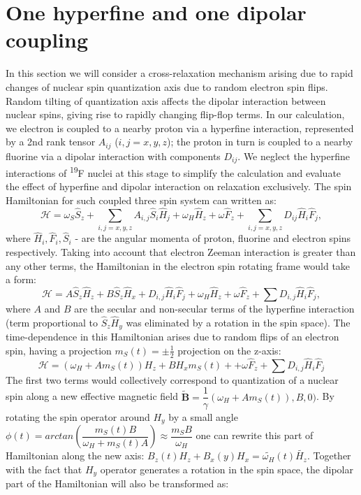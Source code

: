 \documentclass[a4paper, 12pt]{article}
\begin{document}
\section{One hyperfine and one dipolar coupling}
In this section we will consider a cross-relaxation mechanism arising due to rapid changes of nuclear spin quantization axis due to random electron spin flips. Random tilting of quantization axis affects the dipolar interaction between nuclear spins, giving rise to rapidly changing flip-flop terms.
In our calculation, we electron is coupled to a nearby proton via a hyperfine interaction, represented by a 2nd rank tensor $A_{ij}$ ($i,j=x,y,z$); the proton in turn is coupled to a nearby fluorine via a dipolar interaction with components $D_{ij}$. We neglect the hyperfine interactions of \textsuperscript{19}F nuclei at this stage to simplify the calculation and evaluate the effect of hyperfine and dipolar interaction on relaxation exclusively. The spin Hamiltonian for such coupled three spin system can written as: 
\begin{equation}
\mathcal{H} =  \omega_S \hat{S}_z + \sum_{i,j=x,y,z} A_{i,j} \hat{S}_i \hat{H}_j + \omega_H \hat{H}_z + \omega \hat{F}_z + \sum_{i,j=x,y,z} D_{ij} \hat{H}_i \hat{F}_j,
\end{equation}
where $\hat{H}_i, \hat{F}_i, \hat{S}_i$ - are the angular momenta of proton, fluorine and electron spins respectively. Taking into account that electron Zeeman interaction is greater than any other terms, the Hamiltonian in the electron spin rotating frame would take a form:
\begin{equation}
  \mathcal{H}  = A \hat{S}_z \hat{H}_z + B \hat{S}_z \hat{H}_x + D_{i,j} \hat{H}_i \hat{F}_j +  \omega_H \hat{H}_z + \omega \hat{F}_z + \sum D_{i,j} \hat{H}_i \hat{F}_j,
\end{equation}
where $A$ and $B$ are the secular and non-secular terms of the hyperfine interaction (term proportional to $\hat{S}_z \hat{H}_y$ was eliminated by a rotation in the spin space). The time-dependence in this Hamiltonian arises due to random flips of an electron spin, having a projection $m_S(t)=\pm \frac{1}{2}$ projection on the z-axis:
\begin{equation}
\mathcal{H} = (\omega_H + A m_S(t)) H_z + B H_x m_S(t) + + \omega \hat{F}_z + \sum D_{i,j} \hat{H}_i \hat{F}_j
\end{equation}
The first two terms would collectively correspond to quantization of a nuclear spin along a new effective magnetic field $\tilde{\mathbf{B}}=\dfrac{1}{\gamma}(\omega_H + A m_S(t)), B, 0)$. By rotating the spin operator around $H_y$ by a small angle $\phi(t)= arctan(\dfrac{m_S(t)B}{\omega_H + m_S(t) A} )  \approx \dfrac{m_S B}{\omega_H}$ one can rewrite this part of Hamiltonian along the new axis: $B_z(t) H_z + B_x(y) H_x = \tilde{\omega_H}(t) \tilde{H_z}$. Together with the fact that $H_y$ operator generates a rotation in the spin space, the dipolar part of the Hamiltonian will also be transformed as:
\end{document}
